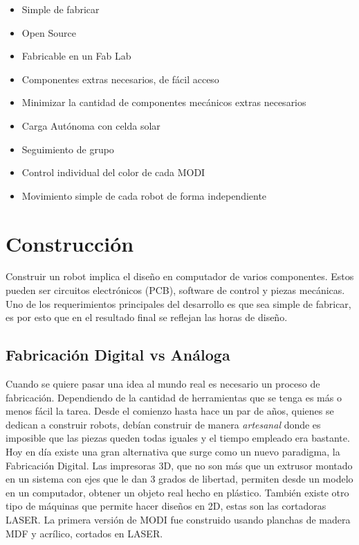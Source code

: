 \begin{itemize}
\item Simple de fabricar
\item Open Source
\item Fabricable en un Fab Lab
\item Componentes extras necesarios, de fácil acceso
\item Minimizar la cantidad de componentes mecánicos extras necesarios
\item Carga Autónoma con celda solar
\item Seguimiento de grupo
\item Control individual del color de cada MODI
\item Movimiento simple de cada robot de forma independiente
\end{itemize}


\section{Construcción}

Construir un robot implica el diseño en computador de varios componentes. Estos pueden ser circuitos electrónicos (PCB), software de control y piezas mecánicas. Uno de los requerimientos principales del desarrollo es que sea simple de fabricar, es por esto que en el resultado final se reflejan las horas de diseño.

\subsection{Fabricación Digital vs Análoga}
Cuando se quiere pasar una idea al mundo real es necesario un proceso de fabricación. Dependiendo de la cantidad de herramientas que se tenga es más o menos fácil la tarea. Desde el comienzo hasta hace un par de años, quienes se dedican a construir robots, debían construir de manera \textit{artesanal} donde es imposible que las piezas queden todas iguales y el tiempo empleado era bastante. Hoy en día existe una gran alternativa que surge como un nuevo paradigma, la Fabricación Digital. Las impresoras 3D, que no son más que un extrusor montado en un sistema con ejes que le dan 3 grados de libertad, permiten desde un modelo en un computador, obtener un objeto real hecho en plástico. También existe otro tipo de máquinas que permite hacer diseños en 2D, estas son las cortadoras LASER. La primera versión de MODI fue construido usando planchas de madera MDF y acrílico, cortados en LASER.

